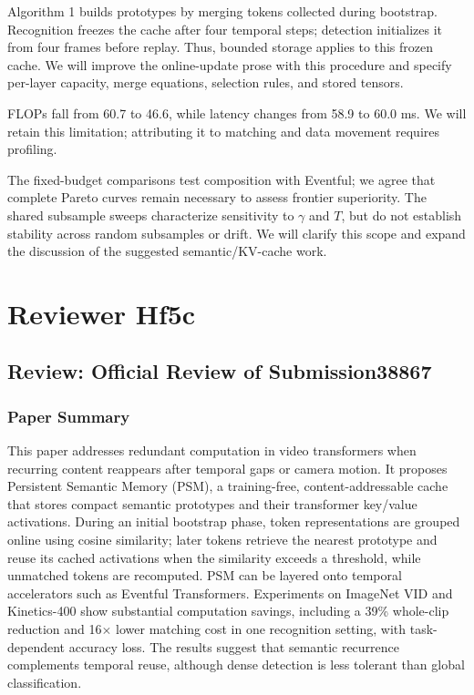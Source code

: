 \documentclass[11pt]{article}
\begin{document}
Algorithm 1 builds prototypes by merging tokens collected during bootstrap. Recognition freezes the cache after four temporal steps; detection initializes it from four frames before replay. Thus, bounded storage applies to this frozen cache. We will improve the online-update prose with this procedure and specify per-layer capacity, merge equations, selection rules, and stored tensors.

FLOPs fall from 60.7 to 46.6, while latency changes from 58.9 to 60.0 ms. We will retain this limitation; attributing it to matching and data movement requires profiling.

The fixed-budget comparisons test composition with Eventful; we agree that complete Pareto curves remain necessary to assess frontier superiority. The shared subsample sweeps characterize sensitivity to $\gamma$ and $T$, but do not establish stability across random subsamples or drift. We will clarify this scope and expand the discussion of the suggested semantic/KV-cache work.

\clearpage

\section{Reviewer Hf5c}

\subsection*{Review: Official Review of Submission38867}

\subsubsection*{Paper Summary}
This paper addresses redundant computation in video transformers when recurring content reappears after temporal gaps or camera motion. It proposes Persistent Semantic Memory (PSM), a training-free, content-addressable cache that stores compact semantic prototypes and their transformer key/value activations. During an initial bootstrap phase, token representations are grouped online using cosine similarity; later tokens retrieve the nearest prototype and reuse its cached activations when the similarity exceeds a threshold, while unmatched tokens are recomputed. PSM can be layered onto temporal accelerators such as Eventful Transformers. Experiments on ImageNet VID and Kinetics-400 show substantial computation savings, including a 39\% whole-clip reduction and 16\(\times\) lower matching cost in one recognition setting, with task-dependent accuracy loss. The results suggest that semantic recurrence complements temporal reuse, although dense detection is less tolerant than global classification.
\end{document}
